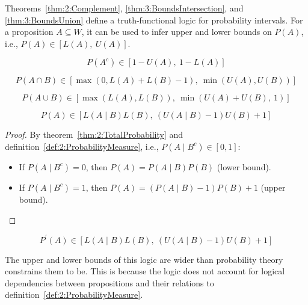 Theorems~\ref{thm:2:Complement},
\ref{thm:3:BoundsIntersection}, and \ref{thm:3:BoundsUnion} define a
truth-functional logic for probability intervals.
For a proposition $A \subseteq W$, it can be used to infer upper and lower
bounds on $P(A)$, i.e., $P(A) \in [L(A),\ U(A)]$.

\begin{thm}
  \begin{equation}
    P(A^c) \in [1 - U(A),\ 1 - L(A)]
  \end{equation}
\end{thm}

\begin{thm}
  \begin{equation}
    P(A \cap B) \in [\max(0, L(A) + L(B) - 1),\ \min(U(A), U(B))]
  \end{equation}
\end{thm}

\begin{thm}
  \begin{equation}
    P(A \cup B) \in [\max(L(A), L(B)),\ \min(U(A) + U(B),\ 1)]
  \end{equation}
\end{thm}

\begin{thm}
  \begin{equation}
    P(A) \in [L(A \mid B) L(B),\ (U(A \mid B) - 1) U(B) + 1]
  \end{equation}
  \begin{proof}
    By theorem~\ref{thm:2:TotalProbability} and
    definition~\ref{def:2:ProbabilityMeasure}, i.e., $P(A \mid B^c) \in [0, 1]$:
    \begin{itemize}
      \item If $P(A \mid B^c) = 0$, then $P(A) = P(A \mid B) P(B)$ (lower bound).
      \item If $P(A \mid B^c) = 1$, then $P(A) = (P(A \mid B) - 1) P(B) + 1$ (upper bound).
    \end{itemize}
  \end{proof}
\end{thm}

\begin{thm}
  \begin{equation}
    P^\prime(A) \in [L(A \mid B) L(B),\ (U(A \mid B) - 1) U(B) + 1]
  \end{equation}
\end{thm}

The upper and lower bounds of this logic are
wider than probability theory constrains them to be.
This is because the logic does not account for logical dependencies between
propositions and their relations to definition~\ref{def:2:ProbabilityMeasure}.
